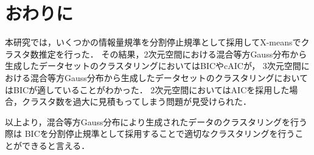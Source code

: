 \section{おわりに}

本研究では，いくつかの情報量規準を分割停止規準として採用してX-meansでクラスタ数推定を行った．
その結果，2次元空間における混合等方Gauss分布から生成したデータセットのクラスタリングにおいてはBICやcAICが，
3次元空間における混合等方Gauss分布から生成したデータセットのクラスタリングにおいてはBICが適していることがわかった．
2次元空間においてはAICを採用した場合，クラスタ数を過大に見積もってしまう問題が見受けられた．

以上より，混合等方Gauss分布により生成されたデータのクラスタリングを行う際は
BICを分割停止規準として採用することで適切なクラスタリングを行うことができると言える．

